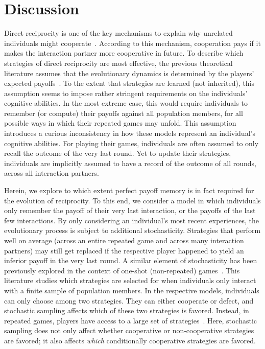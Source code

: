 \documentclass[11pt]{article}
\theoremstyle{plainCl1}
\theoremstyle{plainCl2}
\begin{document}

\section{Discussion}\label{section:discussion}

Direct reciprocity is one of the key mechanisms to explain why unrelated individuals might cooperate~\citep{nowak:Science:2006}. 
According to this mechanism, cooperation pays if it makes the interaction partner more cooperative in future. 
To describe which strategies of direct reciprocity are most effective, the previous theoretical literature assumes that the evolutionary dynamics is determined by the players' expected payoffs~\citep{brauchli:JTB:1999,brandt:JTB:2006,ohtsuki:JTB:2007b,szolnoki:pre:2009b,imhof2010stochastic,van-segbroeck:prl:2012,grujic:jtb:2012,Martinez2012,stewart:pnas:2013,pinheiro:PLoSCB:2014,stewart:games:2015,Baek2016,McAvoy:ProcA:2019,glynatsi:SCR:2020,Schmid:PlosCB:2022,Murase:SciRep:2022}.
To the extent that strategies are learned (not inherited), this assumption seems to impose rather stringent requirements on the individuals' cognitive abilities. 
In the most extreme case, this would require individuals to remember (or compute) their payoffs against all population members, for all possible ways in which their repeated games may unfold. 
This assumption introduces a curious inconsistency in how these models represent an individual's cognitive abilities. 
For playing their games, individuals are often assumed to only recall the outcome of the very last round. 
Yet to update their strategies, individuals are implicitly assumed to have a record of the outcome of all rounds, across all interaction partners. 

Herein, we explore to which extent perfect payoff memory is in fact required for the evolution of reciprocity. 
To this end, we consider a model in which individuals only remember the payoff of their very last interaction, or the payoffs of the last few interactions. 
By only considering an individual's most recent experiences, the evolutionary process is subject to additional stochasticity. 
Strategies that perform well on average (across an entire repeated game and across many interaction partners) may still get replaced if the respective player happened to yield an inferior payoff in the very last round. 
A similar element of stochasticity has been previously explored in the context of one-shot (non-repeated) games~\citep{sanchez:JTB:2005,roca:PhysicalReview:2006,Traulsen:JTB:2007,Woelfing:JTB:2009,Hauert:PRE:2018}. 
This literature studies which strategies are selected for when individuals only interact with a finite sample of population members. 
In the respective models, individuals can only choose among two strategies. 
They can either cooperate or defect, and stochastic sampling affects which of these two strategies is favored. 
Instead, in repeated games, players have access to a large set of strategies~\citep[in our case, all reactive strategies;][]{nowak:APC:1989}. 
Here, stochastic sampling does not only affect whether cooperative or non-cooperative strategies are favored; it also affects {\it which} conditionally cooperative strategies are favored. 
\end{document}
